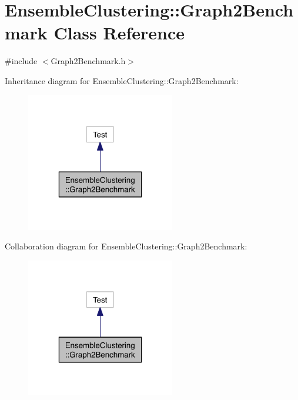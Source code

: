 \hypertarget{class_ensemble_clustering_1_1_graph2_benchmark}{\section{Ensemble\-Clustering\-:\-:Graph2\-Benchmark Class Reference}
\label{class_ensemble_clustering_1_1_graph2_benchmark}
}


{\ttfamily \#include $<$Graph2\-Benchmark.\-h$>$}



Inheritance diagram for Ensemble\-Clustering\-:\-:Graph2\-Benchmark\-:
\nopagebreak
\begin{figure}[H]
\begin{center}
\leavevmode
\includegraphics[width=184pt]{class_ensemble_clustering_1_1_graph2_benchmark__inherit__graph}
\end{center}
\end{figure}


Collaboration diagram for Ensemble\-Clustering\-:\-:Graph2\-Benchmark\-:
\nopagebreak
\begin{figure}[H]
\begin{center}
\leavevmode
\includegraphics[width=184pt]{class_ensemble_clustering_1_1_graph2_benchmark__coll__graph}
\end{center}
\end{figure}
